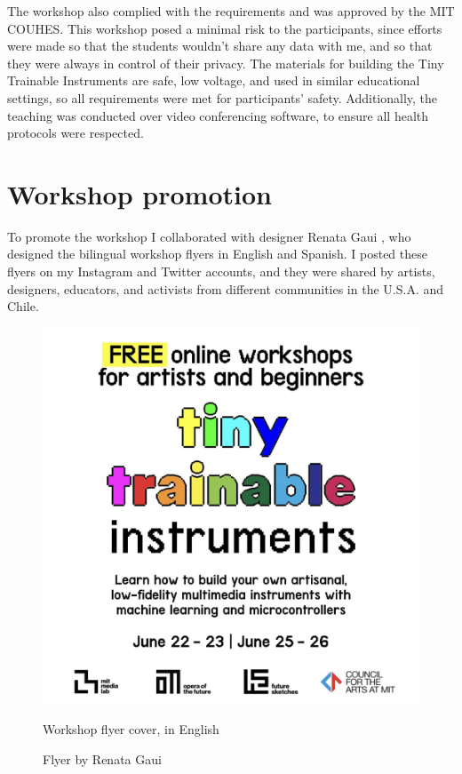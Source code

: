 The workshop also complied with the requirements and was approved by the \acrshort{MIT} \acrfull{COUHES}. This workshop posed a minimal risk to the participants, since efforts were made so that the students wouldn't share any data with me, and so that they were always in control of their privacy. The materials for building the Tiny Trainable Instruments are safe, low voltage, and used in similar educational settings, so all requirements were met for participants' safety. Additionally, the teaching was conducted over video conferencing software, to ensure all health protocols were respected.

\section{Workshop promotion}

To promote the workshop I collaborated with designer Renata Gaui \cite{website-renata-gaui}, who designed the bilingual workshop flyers in English and Spanish. I posted these flyers on my Instagram and Twitter accounts, and they were shared by  artists, designers, educators, and activists from different communities in the U.S.A. and Chile.

\begin{figure}[ht]
  \centering
  \includegraphics[width=0.75\linewidth,height=0.35\textheight,keepaspectratio]{images/workshop-en-1.jpg}
  \caption{Workshop flyer cover, in English}
  \caption*{Flyer by Renata Gaui}
  \label{fig:workshop-english-flyer-page-1}
\end{figure}


